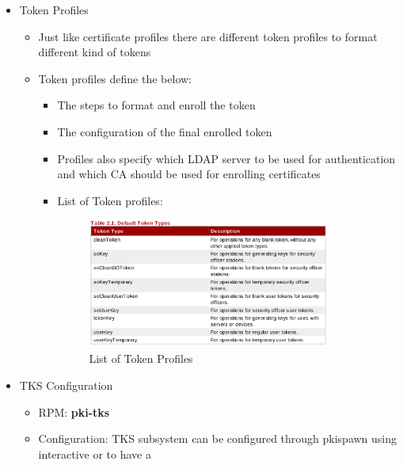 \documentclass[a4paper]{article}
\begin{document}
\begin{itemize}
\begin{itemize}
\begin{itemize}
                        \end{itemize}
                    \item Token Profiles
                        \begin{itemize}
                            \item Just like certificate profiles there are different token profiles to format different kind of tokens 
                            \item Token profiles define the below:
                                \begin{itemize}
                                    \item The steps to format and enroll the token
                                    \item The configuration of the final enrolled token
                                    \item Profiles also specify which LDAP server to be used for authentication and 
                                        which CA should be used for enrolling certificates
                                    \item List of Token profiles:
                                        \begin{figure}[H]
                                            \centering
                                            \includegraphics[width=80mm]{tokenprofiles1.png}
                                            \caption{List of Token Profiles}
                                        \end{figure}
                                \end{itemize}
                        \end{itemize}
                    \item TKS Configuration 
                        \begin{itemize}
                            \item RPM: \textbf{pki-tks}
                            \item Configuration: TKS subsystem can be configured through pkispawn using interactive or to have a 

\end{itemize}
\end{itemize}
\end{itemize}
\end{document}
